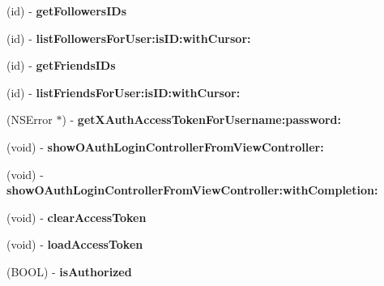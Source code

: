 \begin{DoxyCompactItemize}
\item 
\mbox{\label{interfaceFHSTwitterEngine_a8303c3d7fd67ca98172d5cedc8a5f49f}} 
(id) -\/ {\bfseries get\+Followers\+I\+Ds}
\item 
\mbox{\label{interfaceFHSTwitterEngine_a658446e0127b24612ed6edfb9fbe12bd}} 
(id) -\/ {\bfseries list\+Followers\+For\+User\+:is\+I\+D\+:with\+Cursor\+:}
\item 
\mbox{\label{interfaceFHSTwitterEngine_a4c861d93e17ea32ef58ccd5450f3d551}} 
(id) -\/ {\bfseries get\+Friends\+I\+Ds}
\item 
\mbox{\label{interfaceFHSTwitterEngine_a0c9696fd4e609b061f1efdaeb6cfe77e}} 
(id) -\/ {\bfseries list\+Friends\+For\+User\+:is\+I\+D\+:with\+Cursor\+:}
\item 
\mbox{\label{interfaceFHSTwitterEngine_aae16d1b093cd785077aabb4fb8f7d281}} 
(N\+S\+Error $\ast$) -\/ {\bfseries get\+X\+Auth\+Access\+Token\+For\+Username\+:password\+:}
\item 
\mbox{\label{interfaceFHSTwitterEngine_a4a8139f9c528868bdb412adf417bdfeb}} 
(void) -\/ {\bfseries show\+O\+Auth\+Login\+Controller\+From\+View\+Controller\+:}
\item 
\mbox{\label{interfaceFHSTwitterEngine_a4b0e208b49288e0f0bd13f2ad27e68f0}} 
(void) -\/ {\bfseries show\+O\+Auth\+Login\+Controller\+From\+View\+Controller\+:with\+Completion\+:}
\item 
\mbox{\label{interfaceFHSTwitterEngine_ac74d5b9b2d3916cbcc46f8ce4682d473}} 
(void) -\/ {\bfseries clear\+Access\+Token}
\item 
\mbox{\label{interfaceFHSTwitterEngine_a63771b7d69890db6602852ea3153010e}} 
(void) -\/ {\bfseries load\+Access\+Token}
\item 
\mbox{\label{interfaceFHSTwitterEngine_a9ff748914d9d5a286e5eeeaad1bc804c}} 
(B\+O\+OL) -\/ {\bfseries is\+Authorized}

\end{DoxyCompactItemize}
